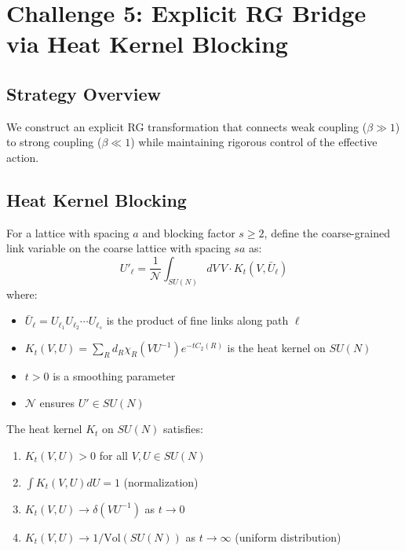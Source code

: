 \section{Challenge 5: Explicit RG Bridge via Heat Kernel Blocking}
\label{sec:challenge5-rg-bridge}

\subsection{Strategy Overview}

We construct an explicit RG transformation that connects weak coupling 
($\beta \gg 1$) to strong coupling ($\beta \ll 1$) while maintaining rigorous 
control of the effective action.

\subsection{Heat Kernel Blocking}

\begin{definition}
\label{def:block-link}
For a lattice with spacing $a$ and blocking factor $s \geq 2$, define the 
coarse-grained link variable on the coarse lattice with spacing $sa$ as:
\[
U'_\ell = \frac{1}{\mathcal{N}} \int_{SU(N)} dV \, V \cdot K_t(V, \bar{U}_\ell)
\]
where:
\begin{itemize}
\item $\bar{U}_\ell = U_{\ell_1} U_{\ell_2} \cdots U_{\ell_s}$ is the product of 
      fine links along path $\ell$
\item $K_t(V, U) = \sum_R d_R \chi_R(VU^{-1}) e^{-t C_2(R)}$ is the heat kernel 
      on $SU(N)$
\item $t > 0$ is a smoothing parameter
\item $\mathcal{N}$ ensures $U' \in SU(N)$
\end{itemize}
\end{definition}

\begin{proposition}
\label{prop:heat-kernel}
The heat kernel $K_t$ on $SU(N)$ satisfies:
\begin{enumerate}[label=(\roman*)]
\item $K_t(V, U) > 0$ for all $V, U \in SU(N)$
\item $\int K_t(V, U) dU = 1$ (normalization)
\item $K_t(V, U) \to \delta(VU^{-1})$ as $t \to 0$
\item $K_t(V, U) \to 1/\text{Vol}(SU(N))$ as $t \to \infty$ (uniform distribution)
\end{enumerate}
\end{proposition}

